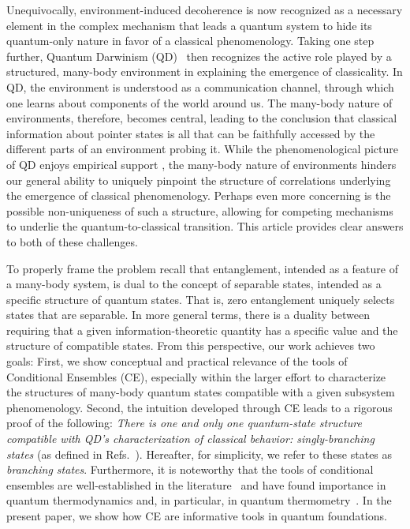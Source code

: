 \documentclass[a4paper,11pt,accepted=2024-09-14]{quantumarticle}
\newcommand{\+}         {\dagger}
\begin{document}
Unequivocally, environment-induced decoherence \cite{basis1,basis2} is now recognized as a necessary element in the complex mechanism that leads a quantum system to hide its quantum-only nature in favor of a classical phenomenology. Taking one step further, Quantum Darwinism (QD)~\cite{Zurek2000AP,Zurek2003RMP,Ollivier2004PRL,Ollivier2005PRA,robin1,robin2, Zurek2009NP, strongqd1,strongqd2, touil2021eavesdropping, girolami2022quantitative,ffs1,ffs2,ffs3} then recognizes the active role played by a structured, many-body environment in explaining the emergence of classicality. In QD, the environment is understood as a communication channel, through which one learns about components of the world around us. The many-body nature of environments, therefore, becomes central, leading to the conclusion that classical information about pointer states is all that can be faithfully accessed by the different parts of an environment probing it. While the phenomenological picture of QD enjoys empirical support \cite{Unden19,Chen19,Ciampini18}, the many-body nature of environments hinders our general ability to uniquely pinpoint the structure of correlations underlying the emergence of classical phenomenology. Perhaps even more concerning is the possible non-uniqueness of such a structure, allowing for competing mechanisms to underlie the quantum-to-classical transition. This article provides clear answers to both of these challenges.

To properly frame the problem recall that entanglement, intended as a feature of a many-body system, is dual to the concept of separable states, intended as a specific structure of quantum states. That is, zero entanglement uniquely selects states that are separable. In more general terms, there is a duality between requiring that a given information-theoretic quantity has a specific value and the structure of compatible states. From this perspective, our work achieves two goals: First, we show conceptual and practical relevance of the tools of {Conditional Ensembles (CE)}, especially within the larger effort to characterize the structures of many-body quantum states compatible with a given subsystem phenomenology. Second, the intuition developed through CE leads to a rigorous proof of the following: \emph{There is one and only one quantum-state structure compatible with QD's characterization of classical behavior: singly-branching states} (as defined in Refs.~\cite{robin1,robin2}). Hereafter, for simplicity, we refer to these states as {\it branching states}. {Furthermore, it is noteworthy that the tools of conditional ensembles are well-established in the literature~\cite{pe1,pe2,pe3,pe4,pe5,pe6} and have found importance in quantum thermodynamics and, in particular, in quantum thermometry~\cite{ce1,ce2,ce3,ce4,ce5,ce6,ce7}. In the present paper, we show how CE are informative tools in quantum foundations.}
\end{document}
